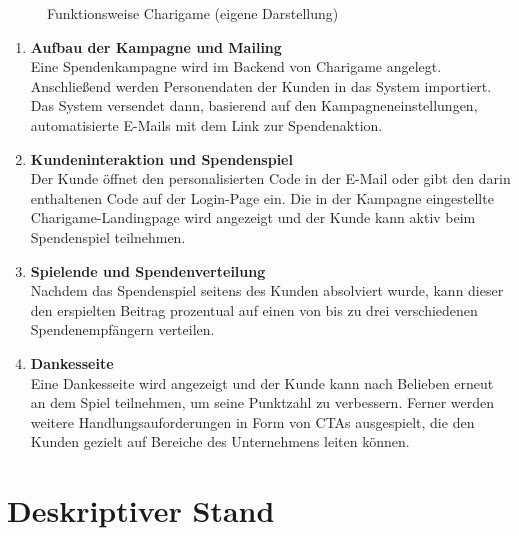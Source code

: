 \begin{figure}[H]
    \centering
    
    \caption{Funktionsweise Charigame (eigene Darstellung)}
    \label{fig:charigame-funktion}
\end{figure}

\begin{enumerate}
    \item \textbf{Aufbau der Kampagne und Mailing}
    \\ Eine Spendenkampagne wird im Backend von Charigame angelegt.
    Anschließend werden Personendaten der Kunden in das System importiert.
    Das System versendet dann, basierend auf den Kampagneneinstellungen, automatisierte E-Mails mit dem Link zur Spendenaktion.
    \item \textbf{Kundeninteraktion und Spendenspiel}
    \\ Der Kunde öffnet den personalisierten Code in der E-Mail oder gibt den darin enthaltenen Code auf der Login-Page ein.
    Die in der Kampagne eingestellte Charigame-Landingpage wird angezeigt und der Kunde kann aktiv beim Spendenspiel teilnehmen.
    \item \textbf{Spielende und Spendenverteilung}
    \\ Nachdem das Spendenspiel seitens des Kunden absolviert wurde, kann dieser den erspielten Beitrag prozentual auf einen von bis zu drei verschiedenen Spendenempfängern verteilen.
    \item \textbf{Dankesseite}
    \\ Eine Dankesseite wird angezeigt und der Kunde kann nach Belieben erneut an dem Spiel teilnehmen, um seine Punktzahl zu verbessern.
    Ferner werden weitere Handlungsauforderungen in Form von CTAs ausgespielt, die den Kunden gezielt auf Bereiche des Unternehmens leiten können.
\end{enumerate}

\section{Deskriptiver Stand}
